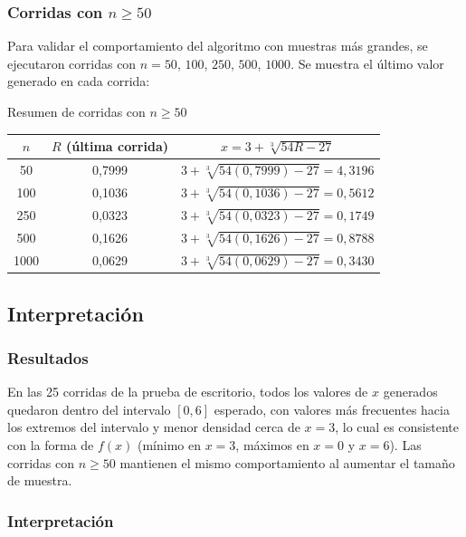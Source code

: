 \subsubsection{\texorpdfstring{Corridas con $n \geq 50$}{Corridas con n mayor igual 50}}

Para validar el comportamiento del algoritmo con muestras más grandes, se ejecutaron corridas con $n = 50$, $100$, $250$, $500$, $1000$. Se muestra el último valor generado en cada corrida:

\begin{mitabla}{\texorpdfstring{Resumen de corridas con $n \geq 50$}{Resumen de corridas con n mayor igual 50}}
\begin{tabular}{ccc}
\toprule
$n$ & $R$ (última corrida) & $x=3+\sqrt[3]{54R-27}$ \\
\midrule
50 & 0,7999 & $3+\sqrt[3]{54(0,7999)-27} = 4,3196$ \\
100 & 0,1036 & $3+\sqrt[3]{54(0,1036)-27} = 0,5612$ \\
250 & 0,0323 & $3+\sqrt[3]{54(0,0323)-27} = 0,1749$ \\
500 & 0,1626 & $3+\sqrt[3]{54(0,1626)-27} = 0,8788$ \\
1000 & 0,0629 & $3+\sqrt[3]{54(0,0629)-27} = 0,3430$ \\
\bottomrule
\end{tabular}
\end{mitabla}

\subsection{Interpretación}

\subsubsection{Resultados}

En las 25 corridas de la prueba de escritorio, todos los valores de $x$ generados quedaron dentro del intervalo $[0,6]$ esperado, con valores más frecuentes hacia los extremos del intervalo y menor densidad cerca de $x=3$, lo cual es consistente con la forma de $f(x)$ (mínimo en $x=3$, máximos en $x=0$ y $x=6$). Las corridas con $n \geq 50$ mantienen el mismo comportamiento al aumentar el tamaño de muestra.

\subsubsection{Interpretación}

